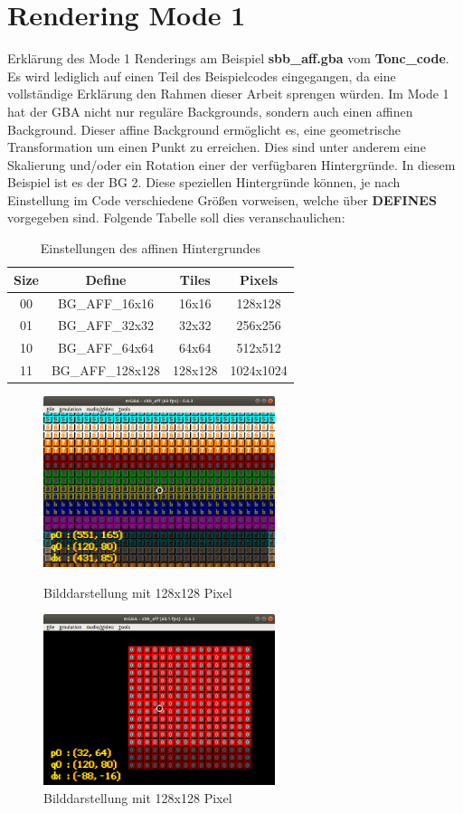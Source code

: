 \chapter{Rendering Mode 1}
Erklärung des Mode 1 Renderings am Beispiel \textbf{sbb\_aff.gba} vom \textbf{Tonc\_code}. Es wird lediglich auf einen Teil des Beispielcodes eingegangen, da eine vollständige Erklärung den Rahmen dieser Arbeit sprengen würden.
Im Mode 1 hat der \ac{GBA} nicht nur reguläre Backgrounds, sondern auch einen affinen Background. 
Dieser affine Background ermöglicht es, eine geometrische Transformation um einen Punkt zu erreichen. Dies sind unter anderem eine Skalierung und/oder ein Rotation einer der verfügbaren Hintergründe. In diesem Beispiel ist es der \ac{BG} 2. Diese speziellen Hintergründe können, je nach Einstellung im Code verschiedene Größen vorweisen, welche über \textbf{DEFINES} vorgegeben sind. Folgende Tabelle soll dies veranschaulichen:
\begin{table}[ht]
\centering
\begin{tabular}{|c|c|c|c|}
\hline
\textbf{Size} & \textbf{Define} & \textbf{Tiles} & \textbf{Pixels} \\ \hline
00 & BG\_AFF\_16x16 & 16x16 & 128x128 \\ \hline
01 & BG\_AFF\_32x32 & 32x32 & 256x256 \\ \hline
10 & BG\_AFF\_64x64 & 64x64 & 512x512 \\ \hline
11 & BG\_AFF\_128x128 & 128x128 & 1024x1024 \\ \hline
\end{tabular}
\caption{Einstellungen des affinen Hintergrundes}
\label{size}
\end{table}
\newpage
\begin{figure}
	\includegraphics[height=50mm]{img/pic128.png}
	\caption{Bilddarstellung mit 128x128 Pixel}
	\label{bild128}
	\includegraphics[height=50mm]{img/pic16.png}
	\caption{Bilddarstellung mit 128x128 Pixel}
	\label{bild16}
\end{figure}
